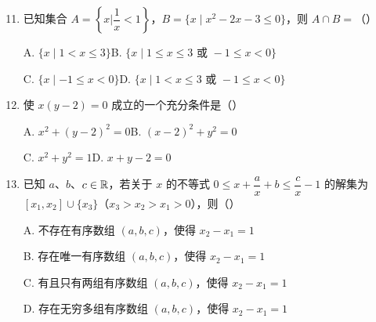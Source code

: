 \documentclass[a4paper,11pt]{article}
\begin{document}
\begin{enumerate}
\setcounter{enumi}{10}

\item 已知集合 $A=\left\{x\mathrel{\Big|}\dfrac1x<1\right\}$，$B=\{x\mid x^2-2x-3\leqslant0\}$，则 $A\cap B=$\mbox{（\quad）}

\keepwithprev
A. $\{x\mid1<x\leqslant3\}$\qquad B. $\{x\mid1\leqslant x\leqslant3\text{ 或 }-1\leqslant x<0\}$

C. $\{x\mid-1\leqslant x<0\}$\qquad D. $\{x\mid1<x\leqslant3\text{ 或 }-1\leqslant x<0\}$


\item 使 $x(y-2)=0$ 成立的一个充分条件是\mbox{（\quad）}

\keepwithprev
A. $x^2+(y-2)^2=0$\qquad B. $(x-2)^2+y^2=0$

C. $x^2+y^2=1$\qquad D. $x+y-2=0$


\ifanswer
\solbegin
{}
\solend

\fi

\item 已知 $a$、$b$、$c\in\mathbb{R}$，若关于 $x$ 的不等式 $0\leqslant x+\dfrac ax+b\leqslant\dfrac cx-1$ 的解集为 $[x_1,x_2]\cup\{x_3\}$（$x_3>x_2>x_1>0$），则\mbox{（\quad）}

\keepwithprev
A. 不存在有序数组 $(a,b,c)$，使得 $x_2-x_1=1$

B. 存在唯一有序数组 $(a,b,c)$，使得 $x_2-x_1=1$

C. 有且只有两组有序数组 $(a,b,c)$，使得 $x_2-x_1=1$

D. 存在无穷多组有序数组 $(a,b,c)$，使得 $x_2-x_1=1$



\end{enumerate}
\end{document}
